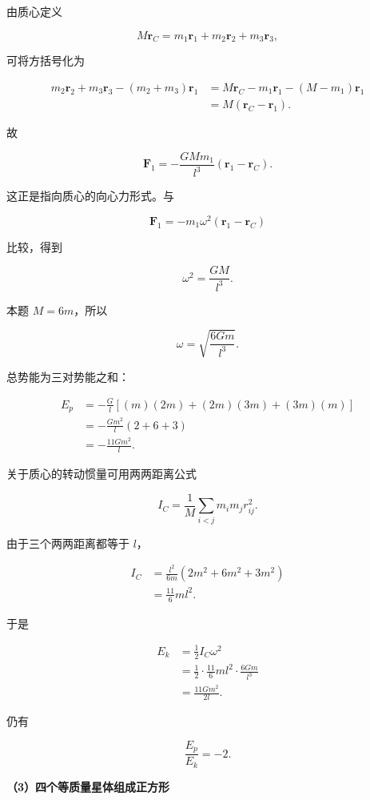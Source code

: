 \documentclass[12pt,a4paper,UTF8]{ctexart}
\begin{document}
由质心定义

\[
M\bm r_C=m_1\bm r_1+m_2\bm r_2+m_3\bm r_3,
\]

可将方括号化为

\[
\begin{aligned}
m_2\bm r_2+m_3\bm r_3-(m_2+m_3)\bm r_1
&=M\bm r_C-m_1\bm r_1-(M-m_1)\bm r_1\\
&=M(\bm r_C-\bm r_1).
\end{aligned}
\]

故

\[
\bm F_1=-\frac{GMm_1}{l^3}(\bm r_1-\bm r_C).
\tag{6}
\]

这正是指向质心的向心力形式。与

\[
\bm F_1=-m_1\omega^2(\bm r_1-\bm r_C)
\]

比较，得到

\[
\omega^2=\frac{GM}{l^3}.
\]

本题 \(M=6m\)，所以

\[
\boxed{\omega=\sqrt{\frac{6Gm}{l^3}}}.
\tag{7}
\]

总势能为三对势能之和：

\[
\begin{aligned}
E_p
&=-\frac{G}{l}\left[(m)(2m)+(2m)(3m)+(3m)(m)\right]\\
&=-\frac{Gm^2}{l}(2+6+3)\\
&=-\frac{11Gm^2}{l}.
\end{aligned}
\tag{8}
\]

关于质心的转动惯量可用两两距离公式

\[
I_C=\frac1M\sum_{i<j}m_im_jr_{ij}^2.
\]

由于三个两两距离都等于 \(l\)，

\[
\begin{aligned}
I_C
&=\frac{l^2}{6m}\left(2m^2+6m^2+3m^2\right)\\
&=\frac{11}{6}ml^2.
\end{aligned}
\tag{9}
\]

于是

\[
\begin{aligned}
E_k
&=\frac12I_C\omega^2\\
&=\frac12\cdot\frac{11}{6}ml^2\cdot\frac{6Gm}{l^3}\\
&=\frac{11Gm^2}{2l}.
\end{aligned}
\tag{10}
\]

仍有

\[
\boxed{\frac{E_p}{E_k}=-2}.
\tag{11}
\]

\textbf{（3）四个等质量星体组成正方形}
\end{document}
